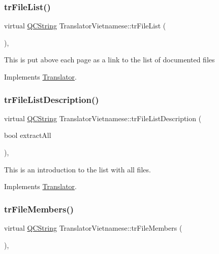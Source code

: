 \subsubsection{\texorpdfstring{trFileList()}{trFileList()}}
{\footnotesize\ttfamily virtual \mbox{\hyperlink{class_q_c_string}{Q\+C\+String}} Translator\+Vietnamese\+::tr\+File\+List (\begin{DoxyParamCaption}{ }\end{DoxyParamCaption})\hspace{0.3cm}{\ttfamily [inline]}, {\ttfamily [virtual]}}

This is put above each page as a link to the list of documented files 

Implements \mbox{\hyperlink{class_translator}{Translator}}.

\mbox{\label{class_translator_vietnamese_a8405dd413217211cfae85f4b467a106f}} 
\subsubsection{\texorpdfstring{trFileListDescription()}{trFileListDescription()}}
{\footnotesize\ttfamily virtual \mbox{\hyperlink{class_q_c_string}{Q\+C\+String}} Translator\+Vietnamese\+::tr\+File\+List\+Description (\begin{DoxyParamCaption}\item[{bool}]{extract\+All }\end{DoxyParamCaption})\hspace{0.3cm}{\ttfamily [inline]}, {\ttfamily [virtual]}}

This is an introduction to the list with all files. 

Implements \mbox{\hyperlink{class_translator}{Translator}}.

\mbox{\label{class_translator_vietnamese_a0fc11ed8307e843a66a5b348dc6e6428}} 
\subsubsection{\texorpdfstring{trFileMembers()}{trFileMembers()}}
{\footnotesize\ttfamily virtual \mbox{\hyperlink{class_q_c_string}{Q\+C\+String}} Translator\+Vietnamese\+::tr\+File\+Members (\begin{DoxyParamCaption}{ }\end{DoxyParamCaption})\hspace{0.3cm}{\ttfamily [inline]}, {\ttfamily [virtual]}}

